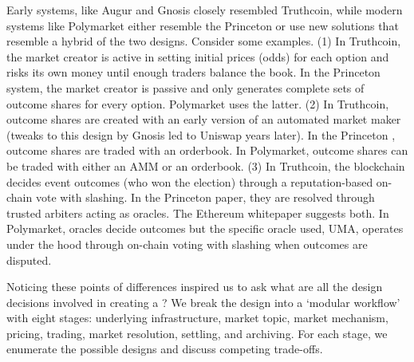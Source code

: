 Early systems, like Augur and Gnosis closely resembled Truthcoin, while modern systems like Polymarket either resemble the Princeton \depm or use new solutions that resemble a hybrid of the two designs. Consider some examples. (1) In Truthcoin, the market creator is active in setting initial prices (\ie odds) for each option and risks its own money until enough traders balance the book. In the Princeton system, the market creator is passive and only generates complete sets of outcome shares for every option. Polymarket uses the latter. (2) In Truthcoin, outcome shares are created with an early version of an automated market maker (tweaks to this design by Gnosis led to Uniswap years later). In the Princeton \depm, outcome shares are traded with an orderbook. In Polymarket, outcome shares can be traded with either an AMM or an orderbook. (3) In Truthcoin, the blockchain decides event outcomes (\eg who won the election) through a reputation-based on-chain vote with slashing. In the Princeton paper, they are resolved through trusted arbiters acting as oracles. The Ethereum whitepaper suggests both. In Polymarket, oracles decide outcomes but the specific oracle used, UMA, operates under the hood through on-chain voting with slashing when outcomes are disputed.

Noticing these points of differences inspired us to ask what are all the design decisions involved in creating a \depm? We break the design into a `modular workflow' with eight stages: underlying infrastructure, market topic, market mechanism, pricing, trading, market resolution, settling, and archiving. For each stage, we enumerate the possible designs and discuss competing trade-offs. 

